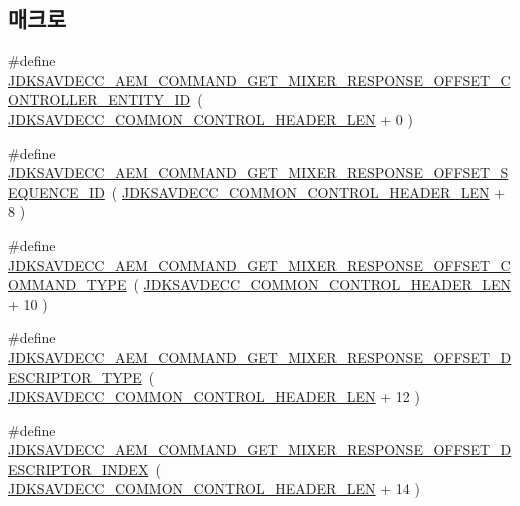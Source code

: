 \subsection*{매크로}
\begin{DoxyCompactItemize}
\item 
\#define \hyperlink{group__command__get__mixer__response_ga4cdcf5d2d23015a9fa3e2d8aeded3b19}{J\+D\+K\+S\+A\+V\+D\+E\+C\+C\+\_\+\+A\+E\+M\+\_\+\+C\+O\+M\+M\+A\+N\+D\+\_\+\+G\+E\+T\+\_\+\+M\+I\+X\+E\+R\+\_\+\+R\+E\+S\+P\+O\+N\+S\+E\+\_\+\+O\+F\+F\+S\+E\+T\+\_\+\+C\+O\+N\+T\+R\+O\+L\+L\+E\+R\+\_\+\+E\+N\+T\+I\+T\+Y\+\_\+\+ID}~( \hyperlink{group__jdksavdecc__avtp__common__control__header_gaae84052886fb1bb42f3bc5f85b741dff}{J\+D\+K\+S\+A\+V\+D\+E\+C\+C\+\_\+\+C\+O\+M\+M\+O\+N\+\_\+\+C\+O\+N\+T\+R\+O\+L\+\_\+\+H\+E\+A\+D\+E\+R\+\_\+\+L\+EN} + 0 )
\item 
\#define \hyperlink{group__command__get__mixer__response_ga1a2b7bad3a01704f5ec5c8057452b488}{J\+D\+K\+S\+A\+V\+D\+E\+C\+C\+\_\+\+A\+E\+M\+\_\+\+C\+O\+M\+M\+A\+N\+D\+\_\+\+G\+E\+T\+\_\+\+M\+I\+X\+E\+R\+\_\+\+R\+E\+S\+P\+O\+N\+S\+E\+\_\+\+O\+F\+F\+S\+E\+T\+\_\+\+S\+E\+Q\+U\+E\+N\+C\+E\+\_\+\+ID}~( \hyperlink{group__jdksavdecc__avtp__common__control__header_gaae84052886fb1bb42f3bc5f85b741dff}{J\+D\+K\+S\+A\+V\+D\+E\+C\+C\+\_\+\+C\+O\+M\+M\+O\+N\+\_\+\+C\+O\+N\+T\+R\+O\+L\+\_\+\+H\+E\+A\+D\+E\+R\+\_\+\+L\+EN} + 8 )
\item 
\#define \hyperlink{group__command__get__mixer__response_ga369ce4627a9907a90e957da73f662d8e}{J\+D\+K\+S\+A\+V\+D\+E\+C\+C\+\_\+\+A\+E\+M\+\_\+\+C\+O\+M\+M\+A\+N\+D\+\_\+\+G\+E\+T\+\_\+\+M\+I\+X\+E\+R\+\_\+\+R\+E\+S\+P\+O\+N\+S\+E\+\_\+\+O\+F\+F\+S\+E\+T\+\_\+\+C\+O\+M\+M\+A\+N\+D\+\_\+\+T\+Y\+PE}~( \hyperlink{group__jdksavdecc__avtp__common__control__header_gaae84052886fb1bb42f3bc5f85b741dff}{J\+D\+K\+S\+A\+V\+D\+E\+C\+C\+\_\+\+C\+O\+M\+M\+O\+N\+\_\+\+C\+O\+N\+T\+R\+O\+L\+\_\+\+H\+E\+A\+D\+E\+R\+\_\+\+L\+EN} + 10 )
\item 
\#define \hyperlink{group__command__get__mixer__response_gae9ce9c8d301514057dab15b3251b83f3}{J\+D\+K\+S\+A\+V\+D\+E\+C\+C\+\_\+\+A\+E\+M\+\_\+\+C\+O\+M\+M\+A\+N\+D\+\_\+\+G\+E\+T\+\_\+\+M\+I\+X\+E\+R\+\_\+\+R\+E\+S\+P\+O\+N\+S\+E\+\_\+\+O\+F\+F\+S\+E\+T\+\_\+\+D\+E\+S\+C\+R\+I\+P\+T\+O\+R\+\_\+\+T\+Y\+PE}~( \hyperlink{group__jdksavdecc__avtp__common__control__header_gaae84052886fb1bb42f3bc5f85b741dff}{J\+D\+K\+S\+A\+V\+D\+E\+C\+C\+\_\+\+C\+O\+M\+M\+O\+N\+\_\+\+C\+O\+N\+T\+R\+O\+L\+\_\+\+H\+E\+A\+D\+E\+R\+\_\+\+L\+EN} + 12 )
\item 
\#define \hyperlink{group__command__get__mixer__response_ga6d836a6f1b8eaa84d5b4ba840e916c59}{J\+D\+K\+S\+A\+V\+D\+E\+C\+C\+\_\+\+A\+E\+M\+\_\+\+C\+O\+M\+M\+A\+N\+D\+\_\+\+G\+E\+T\+\_\+\+M\+I\+X\+E\+R\+\_\+\+R\+E\+S\+P\+O\+N\+S\+E\+\_\+\+O\+F\+F\+S\+E\+T\+\_\+\+D\+E\+S\+C\+R\+I\+P\+T\+O\+R\+\_\+\+I\+N\+D\+EX}~( \hyperlink{group__jdksavdecc__avtp__common__control__header_gaae84052886fb1bb42f3bc5f85b741dff}{J\+D\+K\+S\+A\+V\+D\+E\+C\+C\+\_\+\+C\+O\+M\+M\+O\+N\+\_\+\+C\+O\+N\+T\+R\+O\+L\+\_\+\+H\+E\+A\+D\+E\+R\+\_\+\+L\+EN} + 14 )

\end{DoxyCompactItemize}

